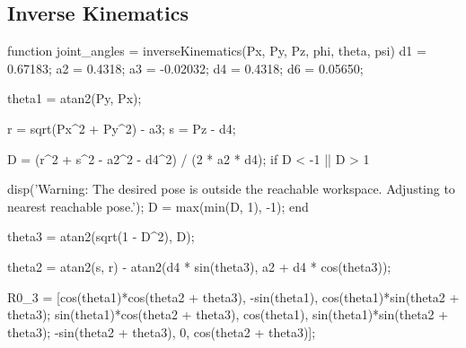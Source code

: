 \documentclass[conference]{IEEEtran}
\begin{document}
\subsection{Inverse Kinematics}
\label{appendix:InverseKinCode}
\begin{matlabcode}[label={InverseKinCodeAppendix}]
function joint_angles = inverseKinematics(Px, Py, Pz, phi, theta, psi)
    d1 = 0.67183;   %
    a2 = 0.4318;    %
    a3 = -0.02032;  %
    d4 = 0.4318;    %
    d6 = 0.05650;   %
    
    theta1 = atan2(Py, Px);
    
    r = sqrt(Px^2 + Py^2) - a3; %
    s = Pz - d4;                %
    
    D = (r^2 + s^2 - a2^2 - d4^2) / (2 * a2 * d4);
    if D < -1 || D > 1


        disp('Warning: The desired pose is outside the reachable workspace. Adjusting to nearest reachable pose.');
        D = max(min(D, 1), -1);  %
    end
    
    theta3 = atan2(sqrt(1 - D^2), D);
    
    theta2 = atan2(s, r) - atan2(d4 * sin(theta3), a2 + d4 * cos(theta3));
    
    R0_3 = [cos(theta1)*cos(theta2 + theta3), -sin(theta1),  cos(theta1)*sin(theta2 + theta3);
            sin(theta1)*cos(theta2 + theta3),  cos(theta1),  sin(theta1)*sin(theta2 + theta3);
            -sin(theta2 + theta3),             0,            cos(theta2 + theta3)];
    

\end{matlabcode}
\end{document}
